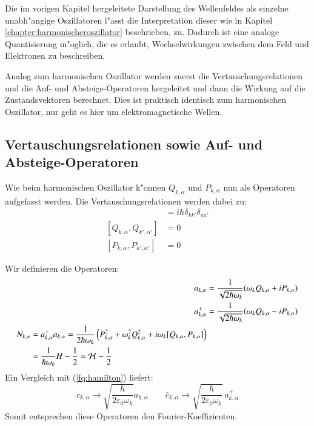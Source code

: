 Die im vorigen Kapitel hergeleitete Darstellung des Wellenfeldes als einzelne unabh"angige Oszillatoren l"asst die Interpretation dieser wie in Kapitel \ref{chapter:harmonischeroszillator} beschrieben, zu. Dadurch ist eine analoge Quantisierung m"oglich, die es erlaubt, Wechselwirkungen zwischen dem Feld und Elektronen zu beschreiben.

Analog zum harmonischen Oszillator werden zuerst die Vertauschungsrelationen und die Auf- und Absteige-Operatoren hergeleitet und dann die Wirkung auf die Zustandsvektoren berechnet. Dies ist praktisch identisch zum harmonischen Oszillator, nur geht es hier um elektromagnetische Wellen.

\subsection{Vertauschungsrelationen sowie Auf- und Absteige-Operatoren}
Wie beim harmonischen Oszillator k"onnen $Q_{k,\alpha}$ und $P_{k,\alpha}$ nun als Operatoren aufgefasst werden. Die Vertauschungsrelationen werden dabei zu:
\begin{align*}
[Q_{k,\alpha}, P_{k',\alpha'}] &= i \hbar \delta_{kk'}\delta_{aa'} \\
[Q_{k,\alpha}, Q_{k',\alpha'}] &= 0 \\
[P_{k,\alpha}, P_{k',\alpha'}] &= 0
\end{align*}

Wir definieren die Operatoren:
\begin{align*}
a_{k,\alpha} &= \frac{1}{\sqrt{2 \hbar \omega_k}} (\omega_k Q_{k,\alpha} + iP_{k,\alpha}) \\
a^+_{k,\alpha} &= \frac{1}{\sqrt{2 \hbar \omega_k}} (\omega_k Q_{k,\alpha} - iP_{k,\alpha})\\
\begin{split}
N_{k,\alpha} &= a^+_{k,\alpha} a_{k,\alpha} = \frac{1}{2 \hbar \omega_k} \left(P_{k,\alpha}^2 + \omega_k^2 Q_{k,\alpha}^2 + i\omega_k [Q_{k,\alpha},P_{k,\alpha}] \right) \\
 &= \frac{1}{ \hbar \omega_k } H - \frac{1}{2} = {\cal H} - \frac{1}{2}
\end{split}
\end{align*}
Ein Vergleich mit (\ref{fq:hamilton}) liefert:
\begin{equation} \label{fq:opp_fourier}
 c_{k,\alpha} \rightarrow \sqrt{\frac{\hbar}{2 \varepsilon_0 \omega_k}} a_{k,\alpha} \qquad 
 \bar{c}_{k,\alpha} \rightarrow \sqrt{\frac{\hbar}{2 \varepsilon_0 \omega_k}} \, a^+_{k,\alpha}
\end{equation}
Somit entsprechen diese Operatoren den Fourier-Koeffizienten.


